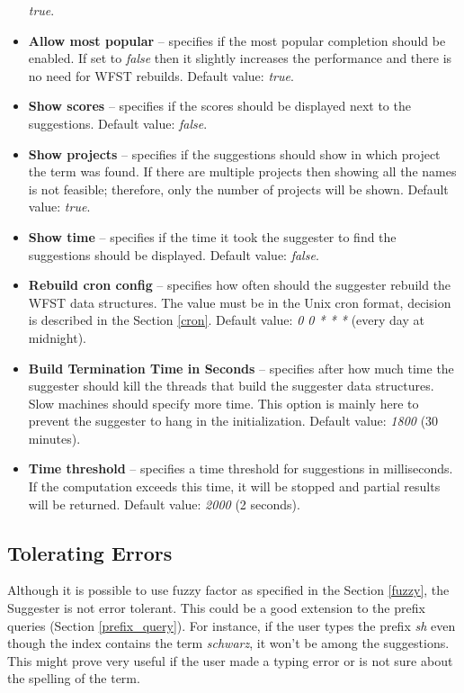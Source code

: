 \begin{itemize}
    \textit{true}.
    \item \textbf{Allow most popular} – specifies if the most popular completion should be enabled.
    If set to \textit{false} then it slightly increases the performance and there is no need for WFST rebuilds. Default value: \textit{true}.
    \item \textbf{Show scores} – specifies if the scores should be displayed next to the suggestions.
    Default value: \textit{false}.
    \item \textbf{Show projects} – specifies if the suggestions should show in which project the term was found.
    If there are multiple projects then showing all the names is not feasible; therefore, only the number of projects will be shown.
    Default value: \textit{true}.
    \item \textbf{Show time} – specifies if the time it took the suggester to find the suggestions should be displayed.
    Default value: \textit{false}.
    \item \textbf{Rebuild cron config} – specifies how often should the suggester rebuild the WFST data structures.
    The value must be in the Unix cron format, decision is described in the Section \ref{cron}.  Default value: \textit{0 0 * * *} (every day at midnight).
    \item \textbf{Build Termination Time in Seconds} – specifies after how much time the suggester should kill the
    threads that build the suggester data structures. Slow machines should specify more time. This option is mainly here
    to prevent the suggester to hang in the initialization. Default value: \textit{1800} (30 minutes).
    \item \textbf{Time threshold} – specifies a time threshold for suggestions in milliseconds.
    If the computation exceeds this time, it will be stopped and partial results will be returned.
    Default value: \textit{2000} (2 seconds).
\end{itemize}

\subsection{Tolerating Errors}
Although it is possible to use fuzzy factor as specified in the Section \ref{fuzzy}, the Suggester is not error tolerant.
This could be a good extension to the prefix queries (Section \ref{prefix_query}).
For instance, if the user types the prefix \textit{sh} even though
the index contains the term \textit{schwarz}, it won't be among the suggestions. This might prove very useful if the
user made a typing error or is not sure about the spelling of the term.

